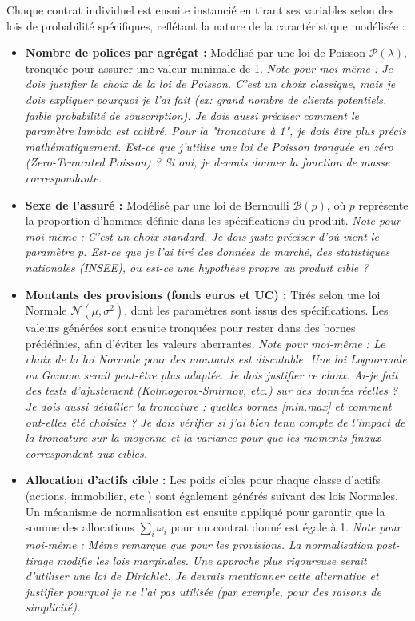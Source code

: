 Chaque contrat individuel est ensuite instancié en tirant ses variables selon des lois de probabilité spécifiques, reflétant la nature de la caractéristique modélisée :
\begin{itemize}
    \item \textbf{Nombre de polices par agrégat :} Modélisé par une loi de Poisson $\mathcal{P}(\lambda)$, tronquée pour assurer une valeur minimale de 1. \textit{Note pour moi-même : Je dois justifier le choix de la loi de Poisson. C'est un choix classique, mais je dois expliquer pourquoi je l'ai fait (ex: grand nombre de clients potentiels, faible probabilité de souscription). Je dois aussi préciser comment le paramètre lambda est calibré. Pour la "troncature à 1", je dois être plus précis mathématiquement. Est-ce que j'utilise une loi de Poisson tronquée en zéro (Zero-Truncated Poisson) ? Si oui, je devrais donner la fonction de masse correspondante.}
    \item \textbf{Sexe de l'assuré :} Modélisé par une loi de Bernoulli $\mathcal{B}(p)$, où $p$ représente la proportion d'hommes définie dans les spécifications du produit. \textit{Note pour moi-même : C'est un choix standard. Je dois juste préciser d'où vient le paramètre p. Est-ce que je l'ai tiré des données de marché, des statistiques nationales (INSEE), ou est-ce une hypothèse propre au produit cible ?}
    \item \textbf{Montants des provisions (fonds euros et UC) :} Tirés selon une loi Normale $\mathcal{N}(\mu, \sigma^2)$, dont les paramètres sont issus des spécifications. Les valeurs générées sont ensuite tronquées pour rester dans des bornes prédéfinies, afin d'éviter les valeurs aberrantes. \textit{Note pour moi-même : Le choix de la loi Normale pour des montants est discutable. Une loi Lognormale ou Gamma serait peut-être plus adaptée. Je dois justifier ce choix. Ai-je fait des tests d'ajustement (Kolmogorov-Smirnov, etc.) sur des données réelles ? Je dois aussi détailler la troncature : quelles bornes [min,max] et comment ont-elles été choisies ? Je dois vérifier si j'ai bien tenu compte de l'impact de la troncature sur la moyenne et la variance pour que les moments finaux correspondent aux cibles.}
    \item \textbf{Allocation d'actifs cible :} Les poids cibles pour chaque classe d'actifs (actions, immobilier, etc.) sont également générés suivant des lois Normales. Un mécanisme de normalisation est ensuite appliqué pour garantir que la somme des allocations $\sum_{i} \omega_i$ pour un contrat donné est égale à 1. \textit{Note pour moi-même : Même remarque que pour les provisions. La normalisation post-tirage modifie les lois marginales. Une approche plus rigoureuse serait d'utiliser une loi de Dirichlet. Je devrais mentionner cette alternative et justifier pourquoi je ne l'ai pas utilisée (par exemple, pour des raisons de simplicité).}

\end{itemize}

